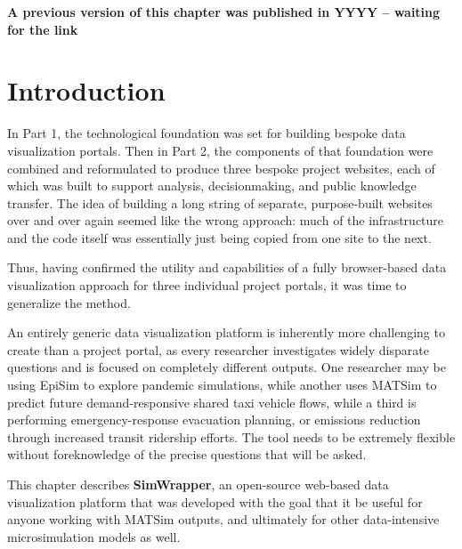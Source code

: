 
\textbf{A previous version of this chapter was published in YYYY -- waiting for the link}

\hypertarget{simwrapper-introduction}{%
\section{Introduction}
\label{simwrapper-introduction}}

In Part 1, the technological foundation was set for building bespoke data visualization portals. Then in Part 2, the components of that foundation were combined and reformulated to produce three bespoke project websites, each of which was built to support analysis, decisionmaking, and public knowledge transfer. The idea of building a long string of separate, purpose-built websites over and over again seemed like the wrong approach: much of the infrastructure and the code itself was essentially just being copied from one site to the next.

Thus, having confirmed the utility and capabilities of a fully browser-based data visualization approach for three individual project portals, it was time to generalize the method.

An entirely generic data visualization platform is inherently more challenging to create than a project portal, as every researcher investigates widely disparate questions and is focused on completely different outputs. One researcher may be using EpiSim to explore pandemic simulations, while another uses MATSim to predict future demand-responsive shared taxi vehicle flows, while a third is performing emergency-response evacuation planning, or emissions reduction through increased transit ridership efforts. The tool needs to be extremely flexible without foreknowledge of the precise questions that will be asked.

This chapter describes \textbf{SimWrapper}, an open-source web-based data visualization platform that was developed with the goal that it be useful for anyone working with MATSim outputs, and ultimately for other data-intensive microsimulation models as well.


